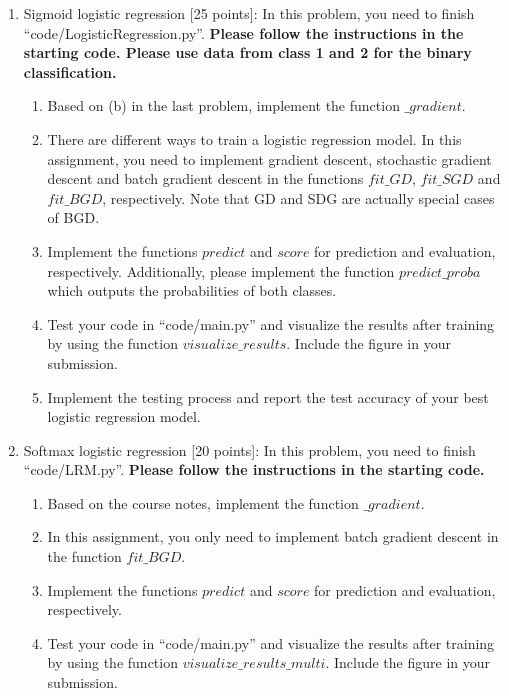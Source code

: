 \documentclass[11pt]{article}
\begin{document}
\begin{enumerate}
    \item Sigmoid logistic regression [25 points]: In this problem, you need to finish ``code/LogisticRegression.py''. \textbf{Please follow the instructions in the starting code. Please use data from class 1 and 2 for the binary classification.}
    \begin{enumerate}
        \item Based on (b) in the last problem, implement the function $\_gradient$.

        \item There are different ways to train a logistic regression model. In this assignment, you need to implement gradient descent, stochastic gradient descent and batch gradient descent in the functions $fit\_GD$, $fit\_SGD$ and $fit\_BGD$, respectively. Note that GD and SDG are actually special cases of BGD.

        \item Implement the functions $predict$ and $score$ for prediction and evaluation, respectively. Additionally, please implement the function $predict\_proba$ which outputs the probabilities of both classes.

        \item Test your code in ``code/main.py'' and visualize the results after training by using the function $visualize\_results$. Include the figure in your submission.

        \item Implement the testing process and report the test accuracy of your best logistic regression model.
    \end{enumerate}

    \item Softmax logistic regression [20 points]: In this problem, you need to finish ``code/LRM.py''. \textbf{Please follow the instructions in the starting code. }
\begin{enumerate}
    \item Based on the course notes, implement the function $\_gradient$.

    \item  In this assignment, you only need to implement  batch gradient descent in the function  $fit\_BGD$.

    \item Implement the functions $predict$ and $score$ for prediction and evaluation, respectively.

    \item Test your code in ``code/main.py'' and visualize the results after training by using the function $visualize\_results\_multi$. Include the figure in your submission.


\end{enumerate}
\end{enumerate}
\end{document}
